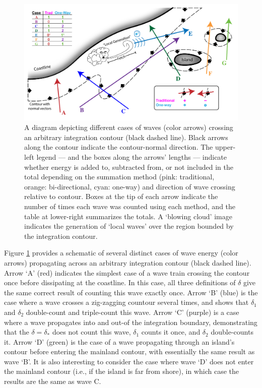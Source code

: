 \begin{figure}[ht]
    \centering
    \includegraphics[width=\linewidth]{../diagram/Schematic03.pdf}
    \caption{A diagram depicting different cases of waves (color arrows) crossing an arbitrary integration contour (black dashed line). Black arrows along the contour indicate the contour-normal direction. The upper-left legend — and the boxes along the arrows' lengths — indicate whether energy is added to, subtracted from, or not included in the total depending on the summation method (pink: traditional, orange: bi-directional, cyan: one-way) and direction of wave crossing relative to contour. Boxes at the tip of each arrow indicate the number of times each wave was counted using each method, and the table at lower-right summarizes the totals. A `blowing cloud' image indicates the generation of `local waves' over the region bounded by the integration contour. }
    \label{fig:one-way-diagram}
\end{figure}

Figure \ref{fig:one-way-diagram} provides a schematic of several distinct cases of wave energy (color arrows) propagating across an arbitrary integration contour (black dashed line). Arrow `A' (red) indicates the simplest case of a wave train crossing the contour once before dissipating at the coastline. In this case, all three definitions of $\delta$ give the same correct result of counting this wave exactly once. Arrow `B' (blue) is the case where a wave crosses a zig-zagging countour several times, and shows that $\delta_1$ and $\delta_2$ double-count and triple-count this wave. Arrow `C' (purple) is a case where a wave propagates into and out-of the integration boundary, demonstrating that the $\delta = \delta_*$ does not count this wave, $\delta_1$ counts it once, and $\delta_2$ double-counts it. Arrow `D' (green) is the case of a wave propagating through an island's contour before entering the mainland contour, with essentially the same result as wave `B'. It is also interesting to consider the case where wave `D' does not enter the mainland contour (i.e., if the island is far from shore), in which case the results are the same as wave C.

